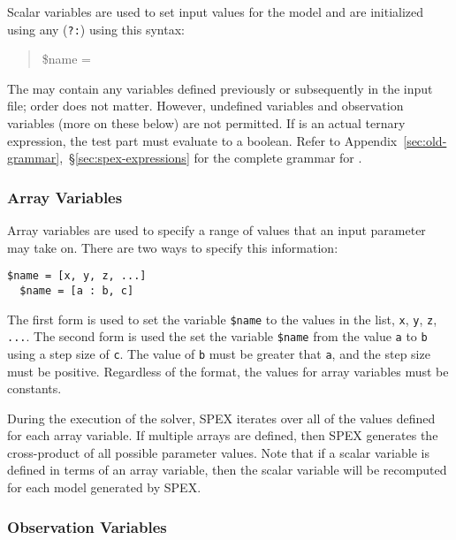 Scalar variables are used to set input values for the model and are initialized using any
 (\texttt{?:}) using this syntax:
\begin{quotation}
    \$name = 
\end{quotation}
The  may contain any variables defined previously or subsequently in the
input file; order does not matter.  However, undefined variables and observation variables (more on these
below) are not permitted.  If  is an actual ternary expression, the test
part must evaluate to a boolean.  Refer to Appendix~\ref{sec:old-grammar},~\S\ref{sec:spex-expressions} for
the complete grammar for .

\subsubsection{Array Variables}
\label{sec:spex-array}

Array variables are used to specify a range of values that an input parameter may take on.  There are two
ways to specify this information:
\begin{lstlisting}[numbersep=10pt,firstnumber=1]
  $name = [x, y, z, ...]
  $name = [a : b, c]
\end{lstlisting}
The first form is used to set the variable \texttt{\$name} to the values in the list, \texttt{x},
\texttt{y}, \texttt{z}, \texttt{...}.  The second form is used the set the variable \texttt{\$name} from the
value \texttt{a} to \texttt{b} using a step size of \texttt{c}.  The value of \texttt{b} must be greater
that \texttt{a}, and the step size must be positive.  Regardless of the format, the values for array
variables must be constants.

During the execution of the solver, SPEX iterates over all of the values defined for each array variable. If
multiple arrays are defined, then SPEX generates the cross-product of all possible parameter values.  Note
that if a scalar variable is defined in terms of an array variable, then the scalar variable will be
recomputed for each model generated by SPEX.

\subsubsection{Observation Variables}
\label{sec:spex-observation}

